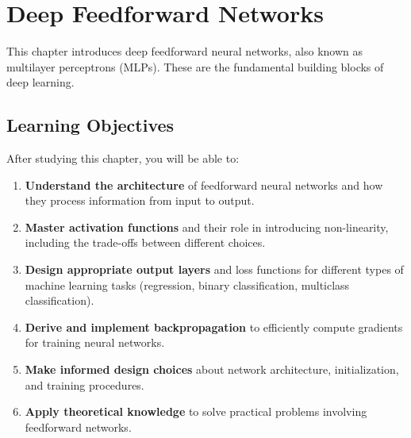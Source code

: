 
\chapter{Deep Feedforward Networks}
\label{chap:feedforward-networks}

This chapter introduces deep feedforward neural networks, also known as multilayer perceptrons (MLPs). These are the fundamental building blocks of deep learning.

\section*{Learning Objectives}
\label{sec:learning-objectives}

After studying this chapter, you will be able to:

\begin{enumerate}
    \item \textbf{Understand the architecture} of feedforward neural networks and how they process information from input to output.
    
    \item \textbf{Master activation functions} and their role in introducing non-linearity, including the trade-offs between different choices.
    
    \item \textbf{Design appropriate output layers} and loss functions for different types of machine learning tasks (regression, binary classification, multiclass classification).
    
    \item \textbf{Derive and implement backpropagation} to efficiently compute gradients for training neural networks.
    
    \item \textbf{Make informed design choices} about network architecture, initialization, and training procedures.
    
    \item \textbf{Apply theoretical knowledge} to solve practical problems involving feedforward networks.
\end{enumerate}










% 



